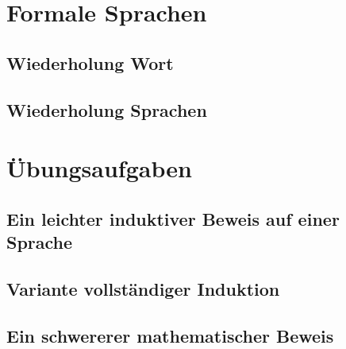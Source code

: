 \section{Formale Sprachen}
\subsection{Wiederholung Wort} %
\subsection{Wiederholung Sprachen} %

\section{Übungsaufgaben}
\subsection{Ein leichter induktiver Beweis auf einer Sprache}
\subsection{Variante vollständiger Induktion} %
\subsection{Ein schwererer mathematischer Beweis}


